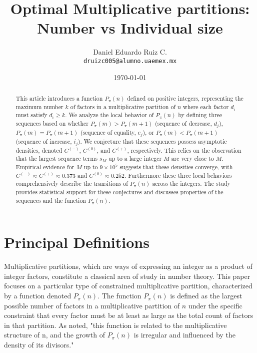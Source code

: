 \documentclass[]{article}
\title{Optimal Multiplicative partitions: Number vs Individual size}
\author{Daniel Eduardo Ruiz C. \\ \texttt{druizc005@alumno.uaemex.mx}}
\date{\today}
\theoremstyle{plain}%
\theoremstyle{definition}
\theoremstyle{remark}
\begin{document}
	
	\maketitle
	
	
	\begin{abstract}
		This article introduces a function $P_{\pi}(n)$ defined on positive integers, representing the maximum number $k$ of factors in a multiplicative partition of $n$ where each factor $d_i$ must satisfy $d_i \ge k$. We analyze the local behavior of $P_{\pi}(n)$ by defining three sequences based on whether $P_{\pi}(m) > P_{\pi}(m+1)$ (sequence of decrease, $d_j$), $P_{\pi}(m) = P_{\pi}(m+1)$ (sequence of equality, $e_j$), or $P_{\pi}(m) < P_{\pi}(m+1)$ (sequence of increase, $i_j$). We conjecture that these sequences possess asymptotic densities, denoted $C^{(-)}$, $C^{(0)}$, and $C^{(+)}$, respectively. This relies on the observation that the largest sequence terms $s_M$ up to a large integer $M$ are very close to $M$. Empirical evidence for $M$ up to $9 \times 10^5$ suggests that these densities converge, with $C^{(-)} \approx C^{(+)} \approx 0.373$ and $C^{(0)} \approx 0.252$. Furthermore these three local behaviors comprehensively describe the transitions of $P_{\pi}(n)$ across the integers. The study provides statistical support for these conjectures and discusses properties of the sequences and the function $P_{\pi}(n)$.
		
	\end{abstract}
	
	\tableofcontents
	
	\section{Principal Definitions}
	
	Multiplicative partitions, which are ways of expressing an integer as a product of integer factors, constitute a classical area of study in number theory. This paper focuses on a particular type of constrained multiplicative partition, characterized by a function denoted $P_{\pi}(n)$. The function $P_{\pi}(n)$ is defined as the largest possible number of factors in a multiplicative partition of $n$ under the specific constraint that every factor must be at least as large as the total count of factors in that partition. As noted, "this function is related to the multiplicative structure of n, and the growth of $P_{\pi}(n)$ is irregular and influenced by the density of its divisors."
	
\end{document}

